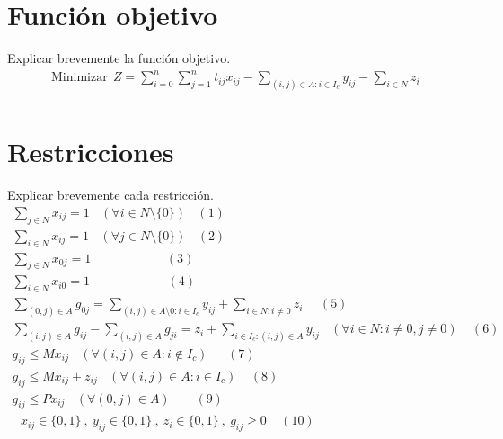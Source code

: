 \documentclass[11pt,addpoints]{article}
\begin{document}
\section{Función objetivo}
Explicar brevemente la función objetivo.
\begin{gather*}
    \text{ Minimizar}\ \ Z = \sum_{i=0}^{n} \sum_{j=1}^{n} t_{ij}x_{ij} - \sum_{(i,j)\in A : i \in I_c } y_{ij} - \sum_{i \in N} z_i\\
\end{gather*}

\section{Restricciones}
Explicar brevemente cada restricción.
\begin{gather*}
    \sum_{j \in N} x_{ij}=1 \ \ \ \ (\forall i \in N\setminus\{0\}) \ \ \ \ (1)\\
    \sum_{i \in N} x_{ij} = 1 \ \ \ \ (\forall j \in N\setminus\{0\}) \ \ \ \ (2) \\
     \sum_{j \in N} x_{0j} = 1 \ \ \ \ \ \ \ \  \ \ \ \   \ \ \ \  \ \ \ \  \ \ \ \ \ \ \ (3) \\
    \sum_{i \in N} x_{i0} = 1 \ \ \ \ \ \ \ \  \ \ \ \   \ \ \ \  \ \ \ \  \ \ \ \ \ \ \ \ (4) \\
     \sum_{(0,j) \in A} g_{0j} = \sum_{(i,j)\in A\setminus{0}:i \in I_{c}} y_{ij} + \sum_{i \in N: i \neq 0} z_i \ \ \ \ \ \ (5) \\
     \sum_{(i,j) \in A} g_{ij} - \sum_{(i,j) \in A} g_{ji} = z_i + \sum_{i \in I_c :(i,j)\in A} y_{ij} \ \ \ \  (\forall i \in N: i\neq0, j\neq0) \ \ \ \ \ (6) \\
     g_{ij} \leq Mx_{ij} \ \ \ \ (\forall (i,j) \in A: i \notin I_c) \ \ \ \ \ \ \ (7)\\
     g_{ij} \leq Mx_{ij} + z_{ij} \ \ \ \ (\forall (i,j) \in A: i \in I_c) \ \ \ \ \ (8)\\
     g_{ij} \leq Px_{ij} \ \ \ \ (\forall (0,j) \in A) \ \ \ \ \ \ \ \ \ (9)\\
    \text{\ \ \ \ } x_{ij} \in \{0,1\} \ , \ y_{ij} \in \{0,1\} \ , \ z_i \in \{0,1\} \ , \ g_{ij} \geq 0 \ \ \ \ \ (10)
\end{gather*}

\newpage %
\vspace*{0.3cm} %
\end{document}

